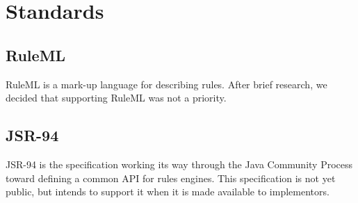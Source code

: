 \section{Standards}

\subsection{RuleML}

RuleML is a mark-up language for describing rules.  After brief
research, we decided that supporting RuleML was not a priority.

\subsection{JSR-94}

JSR-94 is the specification working its way through the Java Community
Process toward defining a common API for rules engines.  This
specification is not yet public, but \drools{} intends to support it 
when it is made available to implementors.

